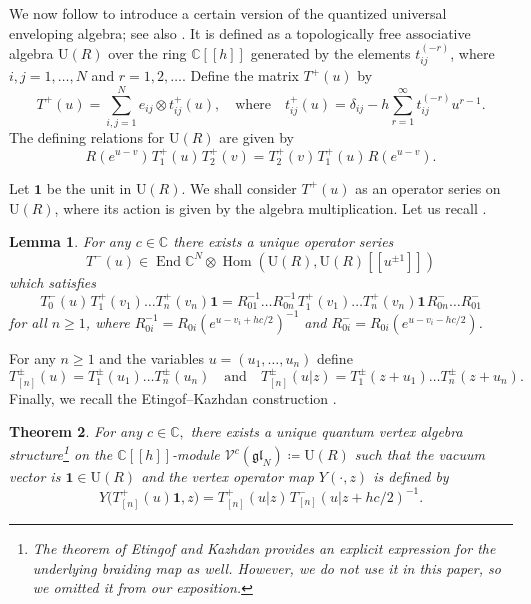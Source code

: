 \documentclass[12pt,a4paper,reqno]{amsart}
\theoremstyle{stil}
\newtheorem{thm}{Theorem}[section]
\theoremstyle{defi}
\theoremstyle{defi}
\theoremstyle{stil}
\theoremstyle{stil}
\newtheorem{lem}[thm]{Lemma}
\theoremstyle{stil}
\theoremstyle{prim}
\newcommand{\fand}{\quad\text{and}\quad}
\newcommand{\beq}{\begin{equation}}
\newcommand{\eeq}{\end{equation}}
\newcommand{\ot}{\otimes}
\newcommand{\ts}{\hspace{1pt}}
\newcommand{\ndo}{\mathop{\mathrm{End}}}
\newcommand{\om}{\mathop{\mathrm{Hom}}}
\newcommand{\vac}{ \mathrm{\boldsymbol{1}}}
\newcommand{\CC}{\mathbb{C}}
\newcommand{\Vcdva}{\mathcal{V}^{c}(\mathfrak{gl}_N)}
\begin{document}
We now follow  \cite{EK3} to introduce a certain version of the    quantized universal enveloping    algebra; see also \cite{FRT,RS}.
It is defined as a topologically free associative algebra $\textrm{U}(R)$ over the ring $\CC[[h]]$ generated by the elements $t_{ij}^{(-r)}$, where  $i,j=1,\ldots ,N$ and $r=1,2,\ldots .$ Define the matrix $T^+ (u) $   by
$$
T^+ (u) =\sum_{i,j=1}^N e_{ij}\ot t^+_{ij}  (u),
\quad\text{where}\quad
 t^+_{ij} (u)=\delta_{ij}-h\sum_{r=1}^{\infty}t_{ij}^{(-r)}u^{r-1} .
$$
The defining relations for $\textrm{U}(R)$ are given by
\beq\label{rtt}
R(e^{u-v})\ts T^+_{1} (u)\ts T^+_2  (v)=  T^+_2  (v)\ts T^+_{1} (u)\ts R(e^{u-v}).
\eeq

  
 
Let $\vac$ be the unit in   $\textrm{U}(R).$   We shall  consider   $T^+ (u)$  as  an operator series  on $\textrm{U}(R)$,
where its action is given by the algebra multiplication. 
Let us recall  \cite[Lemma 2.1]{EK}. 

\begin{lem}\label{lemma21}
For any $c\in\CC$ there exists a unique  operator series
$$T^- (u)\in\ndo\CC^N \ot \om( \textrm{U}(R),\textrm{U}(R) [[u^{\pm 1}]] )$$
which satisfies
$$
  T^-_{0} (u)\ts T_{1}^+ (v_1)\ldots T_{n}^+ (v_n)\vac=
R_{01}^{-1}\ldots R_{0n}^{-1}
\ts T_{1}^+ (v_1)\ldots T_{n }^+ (v_n) \vac\ts  R_{0n}^- \ldots R_{01}^-
$$
for all $n\geqslant 1$, where
$ 
R_{0i}^{-1} = R_{0i} (e^{u-v_i+hc/2})^{-1}$
 and
$R_{0i}^-=R_{0i}  (e^{u-v_i-hc/2})
$.
\end{lem}


For any $n\geqslant 1$ and the variables $u=(u_1,\ldots ,u_n)$ define
$$
T_{[n]}^{\pm} (u )=T_1^\pm( u_1)\ldots T_n^\pm ( u_n)
\fand
T_{[n]}^{\pm} (u|z)=T_1^\pm(z+u_1)\ldots T_n^\pm (z+u_n).
$$ 
Finally, we recall the Etingof--Kazhdan  construction \cite[Thm. 2.3]{EK}.

\begin{thm}\label{EK:qva}
For any $c\in\CC,$ there exists a unique   quantum vertex algebra  structure\footnote{The theorem of Etingof and Kazhdan \cite[Thm. 2.3]{EK} provides an explicit expression for the underlying braiding map as well. However, we do not use it in this paper, so we omitted it from our exposition.} on the $\CC[[h]]$-module $\Vcdva\coloneqq \textrm{U}(R)$
  such that the vacuum vector is $\vac\in \textrm{U}(R) $	and
	the vertex operator map $Y(\cdot ,z)$ is defined by
\beq\label{EK_vo}
Y\big(T^+_{[n]}  (u)\vac,z\big)=T^+_{[n]}  (u|z)\ts T_{[n]}^- (u|z+hc/2)^{-1}. 
\eeq
\end{thm}
\end{document}
